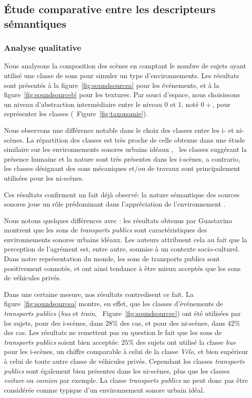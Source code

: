 \subsection{Étude comparative entre les descripteurs sémantiques}

\subsubsection{Analyse qualitative}
\label{sec:ch5_anaQualiSem}

Nous analysons la composition des scènes en comptant le nombre de sujets ayant utilisé une classe de sons pour simuler un type d'environnements. Les résultats sont présentés à la figure~\ref{fig:soundsourcea} pour les événements, et à la figure~\ref{fig:soundsourceb} pour les textures. Par souci d'espace, nous choisissons un niveau d'abstraction intermédiaire entre le niveau 0 et 1, noté $0+$, pour représenter les classes (\cf~Figure~\ref{fig:taxonomie}).

Nous observons une différence notable dans le choix des classes entre les i- et ni-scènes. La répartition des classes est très proche de celle obtenue dans une étude similaire sur les environnements sonores urbains idéaux \citep{guastavino2006ideal}, \ie~les classes suggérant la présence humaine et la nature sont très présentes dans les i-scènes, a contrario, les classes désignant des sons mécaniques et/ou de travaux sont principalement utilisées pour les ni-scènes.

Ces résultats confirment un fait déjà observé: la nature sémantique des sources sonores joue un rôle prédominant dans l'appréciation de l'environnement \citep{raimbault2005urban,dubois2006cognitive}.

Nous notons quelques différences avec \citep{guastavino2006ideal}: les résultats obtenus par Guastavino montrent que les sons de \emph{transports publics} sont caractéristiques des environnements sonores urbains idéaux. Les auteurs attribuent cela au fait que la perception de l'agrément est, entre autre, soumise à un contexte socio-culturel. Dans notre représentation du monde, les sons de transports publics sont positivement connotés, et ont ainsi tendance à être mieux acceptés que les sons de véhicules privés.

Dans une certaine mesure, nos résultats contredisent ce fait. La figure~\ref{fig:soundsourcea} montre, en effet, que les classes d'événements de \emph{transports publics} (\emph{bus} et \emph{train}, \cf~Figure~\ref{fig:soundsourcec}) ont été utilisées par les sujets, pour des i-scènes, dans $28\%$ des cas, et pour des ni-scènes, dans $42\%$ des cas. Les résultats ne remettent pas en question le fait que les sons de \emph{transports publics} soient bien acceptés: $25\%$ des sujets ont utilisé la classe \emph{bus} pour les i-scènes, un chiffre comparable à celui de la classe \emph{Vélo}, et bien supérieur à celui de toute autre classe de véhicules privés. Cependant les classes \emph{transports publics} sont également bien présentes dans les ni-scènes, plus que les classes \emph{voiture} ou \emph{camion} par exemple. La classe \emph{transports publics} ne peut donc pas être considérée comme typique d'un environnement sonore urbain idéal.

